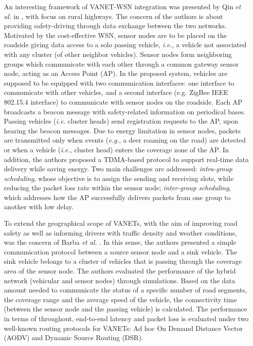\documentclass[10pt,onecolumn]{article}
\begin{document}
An interesting framework of VANET-WSN integration was presented by Qin \textit{et al.} in \cite{HuaQin2010}, with focus on rural highways.
The concern of the authors is about providing safety-driving through data exchange between the two networks. Motivated by the cost-effective WSN, sensor nodes are to be placed on the roadside
giving data access to a solo passing vehicle, \textit{i.e.}, a vehicle not associated with any cluster (of other neighbor vehicles).
Sensor nodes form neighboring groups which communicate with each other through a common gateway sensor node, acting as an Access Point (AP).
In the proposed system, vehicles are supposed to be equipped with two communication interfaces: one interface to communicate with other vehicles, 
and a second interface (e.g. ZigBee IEEE 802.15.4 interface) to communicate with sensor nodes on the roadside. 
Each AP broadcasts a beacon message with safety-related information on periodical bases. Passing vehicles (\textit{i.e.} cluster heads) send registration requests to the AP, upon hearing the beacon messages.
Due to energy limitation in sensor nodes, packets are transmitted only when events (\textit{e.g.}, a deer roaming on the road) are detected or when a vehicle (\textit{i.e.}, cluster head) enters the coverage zone of the AP.
In addition, the authors proposed a TDMA-based protocol to support real-time data delivery while saving energy. Two main challenges are addressed: 
\textit{intra-group scheduling}, whose objective is to assign the sending and receiving slots, while reducing the packet loss rate within the sensor node; 
\textit{inter-group scheduling}, which addresses how the AP successfully delivers packets from one group to another with low delay. 

To extend the geographical scope of VANETs, with the aim of improving road safety as well as informing drivers with traffic density and weather conditions, was the concern of Barba \textit{et al.} \cite{Barba2010}. In this sense, the authors presented a simple communication protocol between a source sensor node and a sink vehicle.
The sink vehicle belongs to a cluster of vehicles that is passing through the coverage area of the sensor node.
The authors evaluated the performance of the hybrid network (vehicular and sensor nodes) through simulations. Based on the data amount needed to communicate the status of a specific number of road segments, the coverage range and the average speed of the vehicle, the connectivity time (between the sensor node and the passing vehicle) is calculated. The performance in terms of throughout, end-to-end latency and packet loss is evaluated under two well-known routing protocols for VANETs: Ad hoc On Demand Distance Vector (AODV) and Dynamic Source Routing (DSR).
\end{document}
